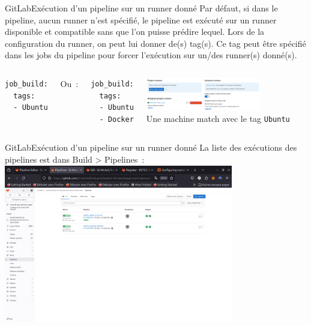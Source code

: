 \documentclass{beamer}
\begin{document}
    \begin{frame}[fragile]{GitLab}{Exécution d'un pipeline sur un runner donné}
        \transdissolve
        Par défaut, si dans le pipeline, aucun runner n'est spécifié, le pipeline est exécuté sur un runner disponible et compatible sans que l'on puisse prédire lequel.
        \bigbreak
        Lors de la configuration du runner, on peut lui donner de(s) tag(s).
        \bigbreak
        Ce tag peut être spécifié dans les jobs du pipeline pour forcer l'exécution sur un/des runner(s) donné(s).
        \begin{columns}
            \begin{lstlisting}[basicstyle=\ttfamily\tiny]
job_build:
  tags:
  - Ubuntu
            \end{lstlisting}
            Ou~:
            \begin{lstlisting}[basicstyle=\ttfamily\tiny]
job_build:
  tags:
  - Ubuntu
  - Docker
            \end{lstlisting}
            \centering
            \includegraphics[width=5cm]{image/gitlab-runners} \\ Une machine match avec le tag \lstinline{Ubuntu} \\
        \end{columns}
    \end{frame}

    \begin{frame}{GitLab}{Exécution d'un pipeline sur un runner donné}
        \transdissolve
        La liste des exécutions des pipelines est dans Build > Pipelines~:
        \bigbreak
        \centering
        \includegraphics[width=10cm]{image/gitlab-pipelines-executions}
    \end{frame}
\end{document}
